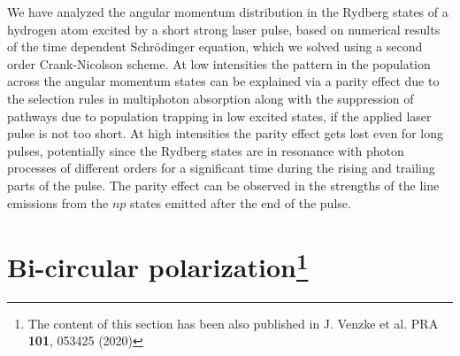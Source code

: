 We have analyzed the angular momentum distribution in the Rydberg states of a hydrogen atom excited by a short strong laser pulse, based on numerical results of the time dependent Schr\"odinger equation, which we solved using a second order Crank-Nicolson scheme. At low intensities the pattern in the population across the angular momentum states can be explained via a parity effect due to the selection rules in multiphoton absorption along with the suppression of pathways due to population trapping in low excited states, if the applied laser pulse is not too short. At high intensities the parity effect gets lost even for long pulses, potentially since the Rydberg states are in resonance with photon processes of different orders for a significant time during the rising and trailing parts of the pulse. The parity effect can be observed in the strengths of the line emissions from the $np$ states emitted after the end of the pulse. 

\section[Bi-circular polarization]{Bi-circular polarization\protect\footnote{The content of this section has been also published in J. Venzke et al. PRA \textbf{101}, 053425  (2020)}} %
\label{sec:bi_circular_polarization}

